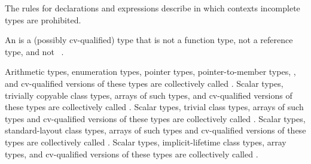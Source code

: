 \pnum
\begin{note}
The rules for declarations and expressions describe in which
contexts incomplete types are prohibited.
\end{note}

\pnum
\label{term.object.type}%
An  is a (possibly cv-qualified) type that is not
a function type, not a reference type, and not \cv{}~.

\pnum
{}%
%
%
\label{term.scalar.type}%
Arithmetic types, enumeration types,
pointer types, pointer-to-member types,
,
and
cv-qualified versions of these
types are collectively called
.
\label{term.trivially.copyable.type}%
Scalar types, trivially copyable class types,
arrays of such types, and cv-qualified versions of these
types are collectively called .
\label{term.trivial.type}%
Scalar types, trivial class types,
arrays of such types and cv-qualified versions of these
types are collectively called
.
\label{term.standard.layout.type}%
Scalar types, standard-layout class
types, arrays of such types and
cv-qualified versions of these types
are collectively called .
Scalar types, implicit-lifetime class types,
array types, and cv-qualified versions of these types
are collectively called .

